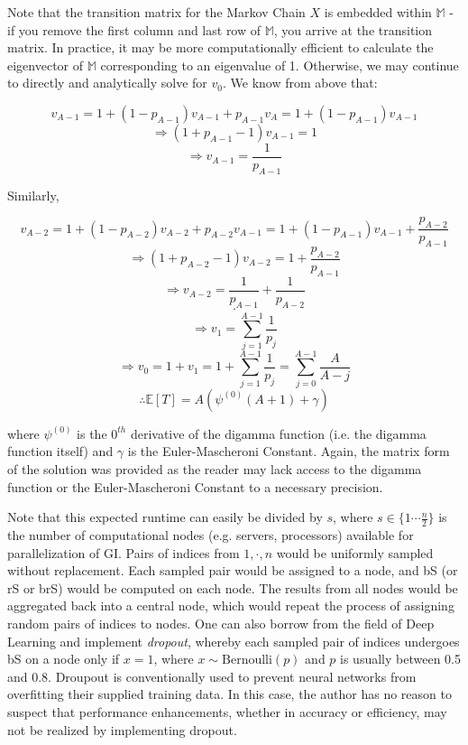 \documentclass{article}
\begin{document}
Note that the transition matrix for the Markov Chain $X$ is embedded within $\mathbb{M}$ - if you remove the first column and last row of $\mathbb{M}$, you arrive at the transition matrix. In practice, it may be more computationally efficient to calculate the eigenvector of $\mathbb{M}$ corresponding to an eigenvalue of 1. Otherwise, we may continue to directly and analytically solve for $v_0$. We know from above that:

\[
v_{A-1} = 1 + (1-p_{A-1})v_{A-1} + p_{A-1}v_A = 1 + (1-p_{A-1})v_{A-1}
\]\[
\Rightarrow (1+p_{A-1}-1)v_{A-1} = 1
\]\[
\Rightarrow v_{A-1} = \frac{1}{p_{A-1}}
\]

Similarly,

\[
v_{A-2} = 1 + (1-p_{A-2})v_{A-2} + p_{A-2}v_{A-1} = 1 + (1-p_{A-1})v_{A-1} + \frac{p_{A-2}}{p_{A-1}}
\]\[
\Rightarrow (1+p_{A-2}-1)v_{A-2} = 1 + \frac{p_{A-2}}{p_{A-1}}
\]\[
\Rightarrow v_{A-2} = \frac{1}{p_{A-1}} + \frac{1}{p_{A-2}}
\]\[
\cdot
\]\[
\Rightarrow v_1 = \sum^{A-1}_{j=1} \frac{1}{p_j}
\]\[
\Rightarrow v_0 = 1 + v_1 = 1 + \sum^{A-1}_{j=1} \frac{1}{p_j} = \sum^{A-1}_{j=0} \frac{A}{A-j}
\]\[
\therefore \mathbb{E}[T] = A(\psi^{(0)}(A+1) + \gamma)
\]

\cite{wolfGI}

where $\psi^{(0)}$ is the $0^{th}$ derivative of the digamma function (i.e. the digamma function itself) and $\gamma$ is the Euler-Mascheroni Constant. Again, the matrix form of the solution was provided as the reader may lack access to the digamma function or the Euler-Mascheroni Constant to a necessary precision.

Note that this expected runtime can easily be divided by $s$, where $s \in \{1 \cdots \frac{n}{2}\}$ is the number of computational nodes (e.g. servers, processors) available for parallelization of GI. Pairs of indices from $1,\cdot,n$ would be uniformly sampled without replacement. Each sampled pair would be assigned to a node, and bS (or rS or brS) would be computed on each node. The results from all nodes would be aggregated back into a central node, which would repeat the process of assigning random pairs of indices to nodes. One can also borrow from the field of Deep Learning and implement \textit{dropout}, whereby each sampled pair of indices undergoes bS on a node only if $x = 1$, where $x \sim \text{Bernoulli}(p)$ and $p$ is usually between 0.5 and 0.8. Droupout is conventionally used to prevent neural networks from overfitting their supplied training data. In this case, the author has no reason to suspect that performance enhancements, whether in accuracy or efficiency, may not be realized by implementing dropout.
\end{document}
